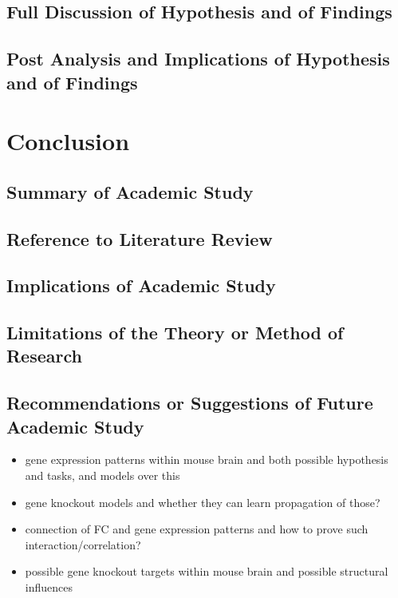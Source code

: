 \documentclass[]{article}
\begin{document}
\subsection*{Full Discussion of Hypothesis and of Findings}
\subsection*{Post Analysis and Implications of Hypothesis and of Findings}



\newpage
\section{Conclusion}
\label{sec:conclusion}

\subsection*{Summary of Academic Study}
\subsection*{Reference to Literature Review}
\subsection*{Implications of Academic Study}
\subsection*{Limitations of the Theory or Method of Research}
\subsection*{Recommendations or Suggestions of Future Academic Study}

\begin{itemize}
	\item gene expression patterns within mouse brain and both possible hypothesis and tasks, and models over this
	\item gene knockout models and whether they can learn propagation of those?
	\item connection of FC and gene expression patterns and how to prove such interaction/correlation?
	\item possible gene knockout targets within mouse brain and possible structural influences
\end{itemize}


\newpage


\end{document}
